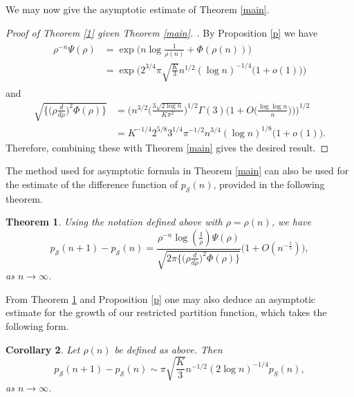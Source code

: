 \documentclass[12pt,reqno]{amsart}
\makeatletter
\def\section{\@startsection{section}{1}
  \z@{.7\linespacing\@plus\linespacing}{.5\linespacing}
  {\normalfont\scshape\bfseries}}
\newtheorem{theorem}{Theorem}[section]
\newtheorem{corollary}[theorem]{Corollary}
\makeatother
\begin{document}
We may now give the asymptotic estimate of Theorem \ref{main}.

\begin{proof}[Proof of Theorem \ref{1} given Theorem \ref{main}. ]
    By Proposition \ref{p} we have
    \begin{align}
    \label{phi}
    \begin{split}
        \rho^{-n}\Psi(\rho)&=\exp\big(n \log \frac{1}{\rho(n)}+\Phi(\rho(n))\big)\\
        &= \exp\Bigg(2^{3/4}\pi\sqrt{\frac{K}{3}}n^{1/2}(\log n)^{-1/4}\big(1+o(1)\big)\Bigg)
    \end{split}
    \end{align}
    and
    \begin{align*}
        \sqrt{ \Big\{\Big(\rho\frac{d}{d\rho}\Big)^2 \Phi(\rho)\Big\}}&=\Bigg(n^{3/2}\Big(\frac{3\sqrt{2\log n}}{K\pi^2}\Big)^{1/2}\Gamma(3)\Big(1+O\Big(\frac{\log \log n}{n}\Big)\Big)\Bigg)^{1/2}\\
        &= K^{-1/4}2^{5/8}3^{1/4}\pi^{-1/2}n^{3/4}(\log n)^{1/8}\big(1+o(1)\big).
    \end{align*}
    Therefore, combining these with Theorem \ref{main} gives the desired result.
\end{proof}

The method used for asymptotic formula in Theorem \ref{main} can also be used for the estimate of the difference function of $p_{\mathcal{S}}(n)$, provided in the following theorem.
\begin{theorem}\label{growth}
Using the notation defined above with $\rho=\rho(n)$, we have
    \begin{equation*}
        p_\mathcal{S}(n+1)-p_\mathcal{S}(n)=\frac{\rho^{-n}\log(\frac{1}{\rho})\Psi(\rho)}{\sqrt{2 \pi  \Big\{\Big(\rho\frac{d}{d\rho}\Big)^2 \Phi(\rho)\Big\}}}\Big(1+O(n^{-\frac{1}{5}})\Big),
    \end{equation*}
    as $n \to \infty$.
\end{theorem}




From Theorem \ref{growth} and Proposition \ref{p} one may also deduce an asymptotic estimate for the growth of our restricted partition function, which takes the following form.


\begin{corollary}
Let $\rho(n)$ be defined as above. Then
    \begin{equation*}
        p_\mathcal{S}(n+1)-p_\mathcal{S}(n)\sim \pi\sqrt{\frac{K}{3}}n^{-1/2}(2\log n)^{-1/4}p_S(n),
    \end{equation*}
    as $n\to \infty$.
\end{corollary}
\end{document}
